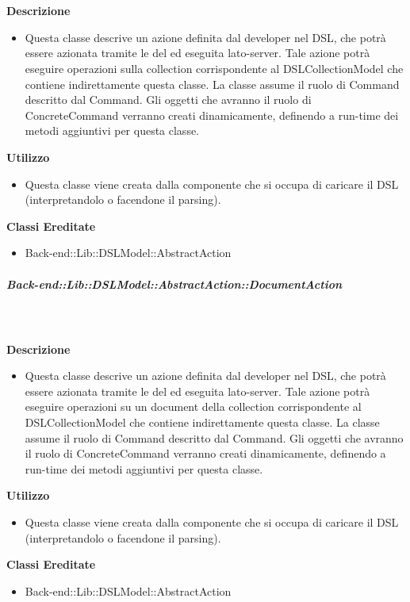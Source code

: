         \textbf{\\ \\ Descrizione} 
          \begin{itemize}
            \item[] Questa classe descrive un azione definita dal developer nel DSL, che potrà essere azionata tramite le  del  ed eseguita lato-server. Tale azione potrà eseguire operazioni sulla collection corrispondente al DSLCollectionModel che contiene indirettamente questa classe. La classe assume il ruolo di Command descritto dal  Command. Gli oggetti che avranno il ruolo di ConcreteCommand verranno creati dinamicamente, definendo a run-time dei metodi aggiuntivi per questa classe.
          \end{itemize}      
        \textbf{Utilizzo}  
          \begin{itemize}
            \item[] Questa classe viene creata dalla componente che si occupa di caricare il DSL (interpretandolo o facendone il parsing).
          \end{itemize}
          \textbf{Classi Ereditate}
          \begin{itemize}
                \item{Back-end::Lib::DSLModel::AbstractAction}
          \end{itemize}
      \subparagraph{Back-end::Lib::DSLModel::AbstractAction::DocumentAction}
        
        \textbf{\\ \\ Descrizione} 
          \begin{itemize}
            \item[] Questa classe descrive un azione definita dal developer nel DSL, che potrà essere azionata tramite le  del  ed eseguita lato-server. Tale azione potrà eseguire operazioni su un document della collection corrispondente al DSLCollectionModel che contiene indirettamente questa classe. La classe assume il ruolo di Command descritto dal  Command. Gli oggetti che avranno il ruolo di ConcreteCommand verranno creati dinamicamente, definendo a run-time dei metodi aggiuntivi per questa classe.
          \end{itemize}      
        \textbf{Utilizzo}  
          \begin{itemize}
            \item[] Questa classe viene creata dalla componente che si occupa di caricare il DSL (interpretandolo o facendone il parsing). 
          \end{itemize}
          \textbf{Classi Ereditate}
          \begin{itemize}
                \item{Back-end::Lib::DSLModel::AbstractAction}
          \end{itemize}
